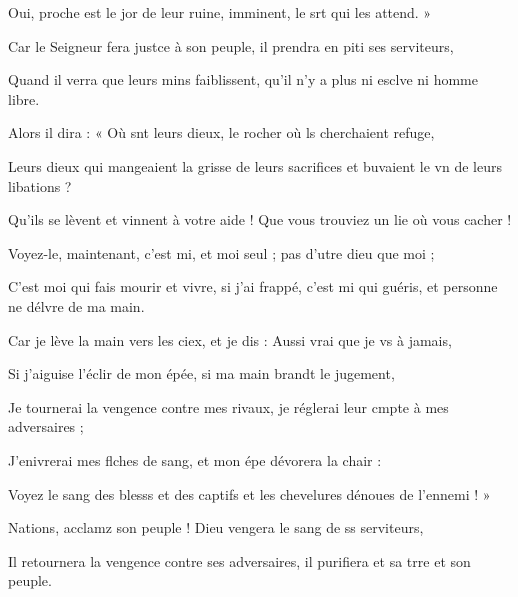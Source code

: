 \item Oui, proche est le jor de leur ruine,\psstar{} imminent, le srt qui les attend. »
\item Car le Seigneur fera justce à son peuple,\psstar{} il prendra en piti ses serviteurs,
\item Quand il verra que leurs mins faiblissent,\psstar{} qu’il n’y a plus ni esclve ni homme libre.
\item Alors il dira : « Où snt leurs dieux,\psstar{} le rocher où ls cherchaient refuge,
\item Leurs dieux qui mangeaient la grisse de leurs sacrifices\psstar{} et buvaient le vn de leurs libations ?
\item Qu’ils se lèvent et vinnent à votre aide !\psstar{} Que vous trouviez un lie où vous cacher !
\item Voyez-le, maintenant, c’est mi, et moi seul ;\psstar{} pas d’utre dieu que moi ;
\item C’est moi qui fais mourir et vivre,\pscross{} si j’ai frappé, c’est mi qui guéris,\psstar{} et personne ne délvre de ma main.
\item Car je lève la main vers les ciex, et je dis :\psstar{} Aussi vrai que je vs à jamais,
\item Si j’aiguise l’éclir de mon épée,\psstar{} si ma main brandt le jugement,
\item Je tournerai la vengence contre mes rivaux,\psstar{} je réglerai leur cmpte à mes adversaires ;
\item J’enivrerai mes flches de sang,\psstar{} et mon épe dévorera la chair :
\item Voyez le sang des blesss et des captifs\psstar{} et les chevelures dénoues de l’ennemi ! »
\item Nations, acclamz son peuple !\psstar{} Dieu vengera le sang de ss serviteurs,
\item Il retournera la vengence contre ses adversaires,\psstar{} il purifiera et sa trre et son peuple.